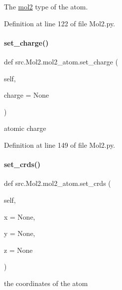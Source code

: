 The \hyperlink{classsrc_1_1Mol2_1_1mol2}{mol2} type of the atom. 



Definition at line 122 of file Mol2.\+py.

\mbox{\label{classsrc_1_1Mol2_1_1mol2__atom_a846b915ceaa2da59962cf5a3ff35db36}} 
\paragraph{\texorpdfstring{set\+\_\+charge()}{set\_charge()}}
{\footnotesize\ttfamily def src.\+Mol2.\+mol2\+\_\+atom.\+set\+\_\+charge (\begin{DoxyParamCaption}\item[{}]{self,  }\item[{}]{charge = {\ttfamily None} }\end{DoxyParamCaption})}



atomic charge 



Definition at line 149 of file Mol2.\+py.

\mbox{\label{classsrc_1_1Mol2_1_1mol2__atom_ae6f5843df04daaed5ec208b4ef6bc8a5}} 
\paragraph{\texorpdfstring{set\+\_\+crds()}{set\_crds()}}
{\footnotesize\ttfamily def src.\+Mol2.\+mol2\+\_\+atom.\+set\+\_\+crds (\begin{DoxyParamCaption}\item[{}]{self,  }\item[{}]{x = {\ttfamily None},  }\item[{}]{y = {\ttfamily None},  }\item[{}]{z = {\ttfamily None} }\end{DoxyParamCaption})}



the coordinates of the atom 



